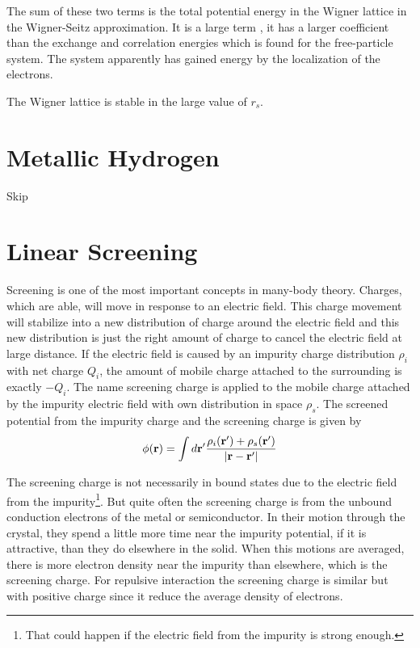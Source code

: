 The sum of these two terms is the total potential energy in the Wigner lattice in the Wigner-Seitz approximation.
It is a large term , it has a larger coefficient than the exchange and correlation energies which is found for the free-particle system.
The system apparently has gained energy by the localization of the electrons.

The Wigner lattice is stable in the large value of $r_s$.

\section{Metallic Hydrogen}\label{s5.3}
Skip

\section{Linear Screening}\label{s5.4}
Screening is one of the most important concepts in many-body theory.
Charges, which are able, will move in response to an electric field.
This charge movement will stabilize into a new distribution of charge around the electric field and this new distribution is just the right amount of charge to cancel the electric field at large distance.
If the electric field is caused by an impurity charge distribution $\rho_i$ with net charge $Q_i$, the amount of mobile charge attached to the surrounding is exactly $-Q_i$.
The name screening charge is applied to the mobile charge attached by the impurity electric field with own distribution in space $\rho_s$.
The screened potential from the impurity charge and the screening charge is given by
\begin{equation}
    \phi(\mathbf{r}) = \int d\mathbf{r}' \frac{\rho_i(\mathbf{r}') + \rho_s(\mathbf{r}')}{\abs{\mathbf{r}-\mathbf{r}'}}    \label{5.89}
\end{equation}

The screening charge is not necessarily in bound states due to the electric field from the impurity\footnote{That could happen if the electric field from the impurity is strong enough.}.
But quite often the screening charge is from the unbound conduction electrons of the metal or semiconductor.
In their motion through the crystal, they spend a little more time near the impurity potential, if it is attractive, than they do elsewhere in the solid.
When this motions are averaged, there is more electron density near the impurity than elsewhere, which is the screening charge.
For repulsive interaction the screening charge is similar but with positive charge since it reduce the average density of electrons.


